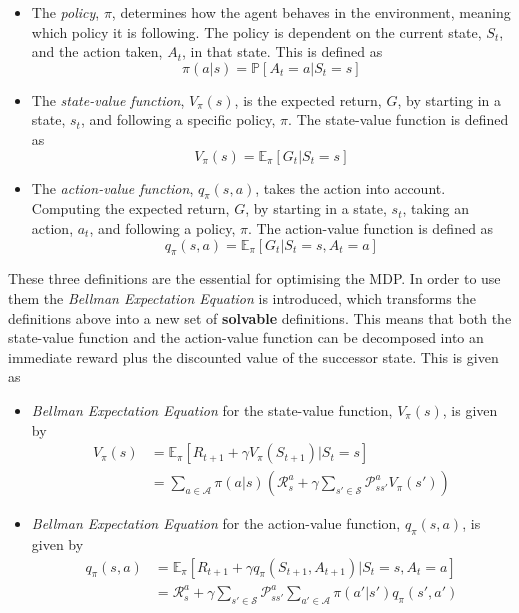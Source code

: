 \begin{itemize}
    \item The \textit{policy}, $\pi$, determines how the agent behaves in the environment, meaning which policy it is following. The policy is dependent on the current state, $S_{t}$, and the action taken, $A_{t}$, in that state. This is defined as
    \begin{equation}
        \pi(a|s) = \mathbb{P}[A_{t}=a | S_{t} = s]
    \end{equation}
    \item The \textit{state-value function}, $V_{\pi}(s)$, is the expected return, $G$, by starting in a state, $s_{t}$, and following a specific policy, $\pi$. The state-value function is defined as 
    \begin{equation}
        V_{\pi}(s) = \mathbb{E}_{\pi}[G_{t}|S_{t}=s]
    \end{equation}
    \item The \textit{action-value function}, $q_{\pi}(s,a)$, takes the action into account. Computing the expected return, $G$, by starting in a state, $s_{t}$, taking an action, $a_{t}$, and following a policy, $\pi$. The action-value function is defined as
    \begin{equation}
        q_{\pi}(s,a) = \mathbb{E}_{\pi}[G_{t}|S_{t}=s, A_{t} = a]
    \end{equation}
\end{itemize}
These three definitions are the essential for optimising the MDP. In order to use them the \textit{Bellman Expectation Equation} \cite{Silver} is introduced, which transforms the
definitions above into a new set of \textbf{solvable} definitions. This means that both the state-value function and the action-value function can be decomposed into an immediate reward plus the discounted value of the successor state. This is given as
\begin{itemize}
    \item \textit{Bellman Expectation Equation} for the state-value function, $V_{\pi}(s)$, is given by
    \begin{align}
        V_{\pi}(s) & = \mathbb{E}_{\pi}[R_{t+1}+\gamma V_{\pi}(S_{t+1})|S_{t}=s] \\
        & = \sum_{a\in \mathcal{A}} \pi(a|s)(\mathcal{R}_{s}^{a}+\gamma \sum_{s'\in \mathcal{S}} \mathcal{P}_{ss'}^{a} V_{\pi}(s'))
    \label{eq:bell1}
    \end{align}
    \item \textit{Bellman Expectation Equation} for the action-value function, $q_{\pi}(s,a)$, is given by
    \begin{align}
        q_{\pi}(s,a) & = \mathbb{E}_{\pi}[R_{t+1}+\gamma q_{\pi}(S_{t+1}, A_{t+1}) | S_{t} = s, A_{t} = a] \\
        & = \mathcal{R}_{s}^{a}+\gamma \sum_{s'\in \mathcal{S}} \mathcal{P}_{ss'}^{a} \sum_{a' \in \mathcal{A}} \pi(a'|s')q_{\pi}(s',a')
    \label{eq:bell2}
    \end{align}
\end{itemize}
